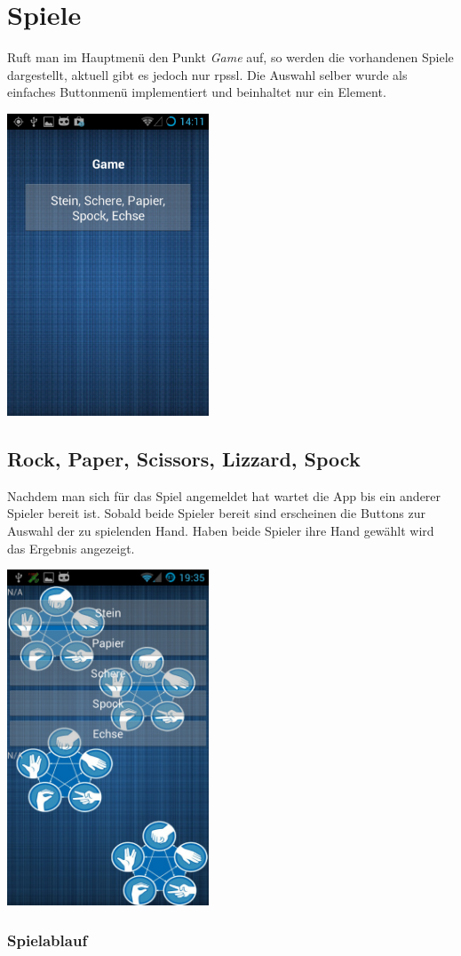 \section{Spiele}
Ruft man im Hauptmenü den Punkt \textit{Game} auf, so werden die vorhandenen Spiele dargestellt, aktuell gibt es jedoch nur \gls{rpssl}. Die Auswahl selber wurde als einfaches Buttonmenü implementiert und beinhaltet nur ein Element.
\begin{capfigure}
	\includegraphics[width=6cm]{images/app/gamelist}
\end{capfigure}


\subsection{Rock, Paper, Scissors, Lizzard, Spock}
Nachdem man sich für das Spiel angemeldet hat wartet die App bis ein anderer Spieler bereit ist. Sobald beide Spieler bereit sind erscheinen die Buttons zur Auswahl der zu spielenden Hand. Haben beide Spieler ihre Hand gewählt wird das Ergebnis angezeigt.

\begin{capfigure}
	\includegraphics[width=6cm]{images/app/rpssl}
\end{capfigure}



\subsubsection{Spielablauf}

